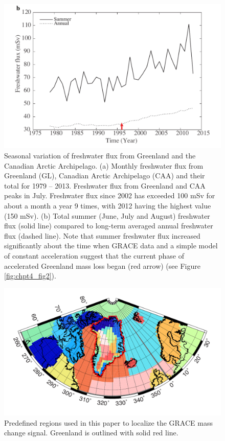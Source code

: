 \begin{figure}
	\centering
	\includegraphics[width=120mm]{figs_app/FigS9b.pdf}
	\caption[Seasonal variation of freshwater flux from Greenland and the Canadian Arctic Archipelago.]{Seasonal variation of freshwater flux from Greenland and the Canadian Arctic Archipelago. (a) Monthly freshwater flux from Greenland (GL), Canadian Arctic Archipelago (CAA) and their total for 1979 – 2013.   Freshwater flux from Greenland and CAA peaks in July.  Freshwater flux since 2002 has exceeded 100 mSv for about a month a year 9 times, with 2012 having the highest value (150 mSv).  (b) Total summer (June, July and August) freshwater flux (solid line) compared to long-term averaged annual freshwater flux (dashed line).  Note that summer freshwater flux increased significantly about the time when GRACE data and a simple model of constant acceleration suggest that the current phase of accelerated Greenland mass loss began (red arrow) (see Figure \ref{fig:chpt4_fig2}).}
	\label{fig:SI4_fig9}
\end{figure}

\clearpage
\begin{figure}
	\centering
	\includegraphics[width=120mm]{figs_app/FigS10.pdf}
	\caption[Predefined regions used in this paper to localize the GRACE mass change signal.]{Predefined regions used in this paper to localize the GRACE mass change signal.  Greenland is outlined with solid red line.}
	\label{fig:SI4_fig10}
\end{figure}

